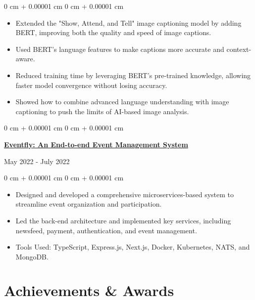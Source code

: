 \documentclass[10pt, letterpaper]{article}
\newenvironment{highlights}{
    \begin{itemize}[
        topsep=0.10 cm,
        parsep=0.10 cm,
        partopsep=0pt,
        itemsep=0pt,
        leftmargin=0 cm + 10pt
    ]
}{
    \end{itemize}
} %
\newenvironment{onecolentry}{
    \begin{adjustwidth}{
        0 cm + 0.00001 cm
    }{
        0 cm + 0.00001 cm
    }
}{
    \end{adjustwidth}
} %
\newenvironment{twocolentry}[2][]{
    \onecolentry
    \def\secondColumn{#2}
    \setcolumnwidth{\fill, 4.5 cm}
    \begin{paracol}{2}
}{
    \switchcolumn \raggedleft \secondColumn
    \end{paracol}
    \endonecolentry
} %
\begin{document}
\begin{onecolentry}
    \begin{highlights}
        \item Extended the "Show, Attend, and Tell" image captioning model by adding BERT, improving both the quality and speed of image captions.
        \item Used BERT's language features to make captions more accurate and context-aware.
        \item Reduced training time by leveraging BERT's pre-trained knowledge, allowing faster model convergence without losing accuracy.
        \item Showed how to combine advanced language understanding with image captioning to push the limits of AI-based image analysis.
    \end{highlights}
\end{onecolentry}
        
\begin{twocolentry}{
            {May 2022 - July 2022}
        }
            \href{https://github.com/eventfly/Microservices}{\textbf{Eventfly: An End-to-end Event Management System}}
        \end{twocolentry}
        
        \vspace{0.10 cm}
        
        \begin{onecolentry}
            \begin{highlights}
    \item Designed and developed a comprehensive microservices-based system to streamline event organization and participation.
    \item Led the back-end architecture and implemented key services, including newsfeed, payment, authentication, and event management.
    \item Tools Used: TypeScript, Express.js, Next.js, Docker, Kubernetes, NATS, and MongoDB.
\end{highlights}
        \end{onecolentry}


        \vspace{0.2 cm}

    \section{Achievements \& Awards}
\end{document}
